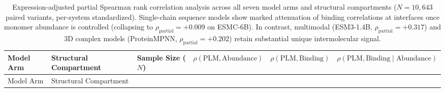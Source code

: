 \documentclass[
  11pt,
  us-letterpaper,
  DIV=11,
  numbers=noendperiod]{scrartcl}
\begin{document}
\begin{longtable}[]{@{}
  >{\raggedright\arraybackslash}p{}
  >{\raggedright\arraybackslash}p{}
  >{\centering\arraybackslash}p{}
  >{\centering\arraybackslash}p{}
  >{\centering\arraybackslash}p{}
  >{\centering\arraybackslash}p{}@{}}
\caption{Expression-adjusted partial Spearman rank correlation analysis
across all seven model arms and structural compartments (\(N = 10,643\)
paired variants, per-system standardized). Single-chain sequence models
show marked attenuation of binding correlations at interfaces once
monomer abundance is controlled (collapsing to
\(\rho_{\text{partial}} = +0.009\) on ESMC-6B). In contrast, multimodal
(ESM3-1.4B, \(\rho_{\text{partial}} = +0.317\)) and 3D complex models
(ProteinMPNN, \(\rho_{\text{partial}} = +0.202\)) retain substantial
unique intermolecular signal.}\label{tbl-mediation-table}\tabularnewline
\toprule\noalign{}
\begin{minipage}[b]{\linewidth}\raggedright
Model Arm
\end{minipage} & \begin{minipage}[b]{\linewidth}\raggedright
Structural Compartment
\end{minipage} & \begin{minipage}[b]{\linewidth}\centering
Sample Size (\(N\))
\end{minipage} & \begin{minipage}[b]{\linewidth}\centering
\(\rho(\text{PLM}, \text{Abundance})\)
\end{minipage} & \begin{minipage}[b]{\linewidth}\centering
\(\rho(\text{PLM}, \text{Binding})\)
\end{minipage} & \begin{minipage}[b]{\linewidth}\centering
\(\rho(\text{PLM}, \text{Binding} \mid \text{Abundance})\)
\end{minipage} \\
\midrule\noalign{}
\endfirsthead
\toprule\noalign{}
\begin{minipage}[b]{\linewidth}\raggedright
Model Arm
\end{minipage} & \begin{minipage}[b]{\linewidth}\raggedright
Structural Compartment
\end{minipage} & \begin{minipage}[b]{\linewidth}\centering

\end{minipage}
\end{longtable}
\end{document}
